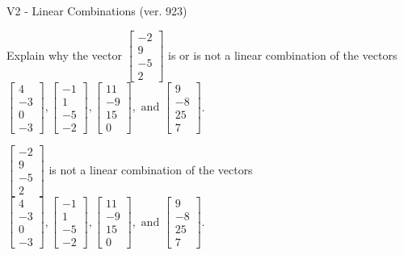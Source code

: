 \begin{exercise}
  \begin{exerciseTitle}V2 - Linear Combinations (ver. 923)\end{exerciseTitle}
  \begin{exerciseStatement}
    Explain why the vector \(\left[\begin{array}{c}
-2 \\
9 \\
-5 \\
2
\end{array}\right]\)  is or is not a linear 
	combination of the vectors \(\left[\begin{array}{c}
4 \\
-3 \\
0 \\
-3
\end{array}\right] , \left[\begin{array}{c}
-1 \\
1 \\
-5 \\
-2
\end{array}\right] , \left[\begin{array}{c}
11 \\
-9 \\
15 \\
0
\end{array}\right] , \text{ and } \left[\begin{array}{c}
9 \\
-8 \\
25 \\
7
\end{array}\right]\).
	


  \end{exerciseStatement}
  \begin{exerciseAnswer}
   \(\left[\begin{array}{c}
-2 \\
9 \\
-5 \\
2
\end{array}\right]\) 
  	 is not  
	a linear combination of the vectors \(\left[\begin{array}{c}
4 \\
-3 \\
0 \\
-3
\end{array}\right] , \left[\begin{array}{c}
-1 \\
1 \\
-5 \\
-2
\end{array}\right] , \left[\begin{array}{c}
11 \\
-9 \\
15 \\
0
\end{array}\right] , \text{ and } \left[\begin{array}{c}
9 \\
-8 \\
25 \\
7
\end{array}\right]\).


\end{exerciseAnswer}
\end{exercise}
